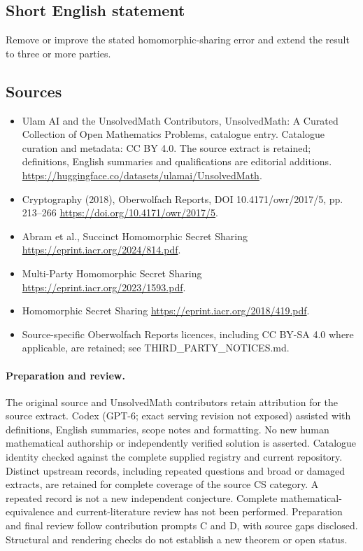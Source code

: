 \documentclass[11pt]{article}
\begin{document}
\subsection{Short English statement}
Remove or improve the stated homomorphic-sharing error and extend the result to three or more parties.
\subsection{Sources}
\begin{itemize}
\item[\hypertarget{source:statement:1}{S1}] Ulam AI and the UnsolvedMath Contributors, UnsolvedMath: A Curated Collection of Open Mathematics Problems, catalogue entry. Catalogue curation and metadata: CC BY 4.0. The source extract is retained; definitions, English summaries and qualifications are editorial additions.
\url{https://huggingface.co/datasets/ulamai/UnsolvedMath}.
\item[\hypertarget{source:statement:2}{S2}] Cryptography (2018), Oberwolfach Reports, DOI 10.4171/owr/2017/5, pp. 213--266
\url{https://doi.org/10.4171/owr/2017/5}.
\item[\hypertarget{source:statement:3}{S3}] Abram et al., Succinct Homomorphic Secret Sharing
\url{https://eprint.iacr.org/2024/814.pdf}.
\item[\hypertarget{source:statement:4}{S4}] Multi-Party Homomorphic Secret Sharing
\url{https://eprint.iacr.org/2023/1593.pdf}.
\item[\hypertarget{source:statement:5}{S5}] Homomorphic Secret Sharing
\url{https://eprint.iacr.org/2018/419.pdf}.
\item Source-specific Oberwolfach Reports licences, including CC BY-SA 4.0 where applicable, are retained; see THIRD\_PARTY\_NOTICES.md.
\end{itemize}
\paragraph{Preparation and review.}
The original source and UnsolvedMath contributors retain attribution for the source extract. Codex (GPT-6; exact serving revision not exposed) assisted with definitions, English summaries, scope notes and formatting. No new human mathematical authorship or independently verified solution is asserted. Catalogue identity checked against the complete supplied registry and current repository. Distinct upstream records, including repeated questions and broad or damaged extracts, are retained for complete coverage of the source CS category. A repeated record is not a new independent conjecture. Complete mathematical-equivalence and current-literature review has not been performed. Preparation and final review follow contribution prompts C and D, with source gaps disclosed. Structural and rendering checks do not establish a new theorem or open status.
\label{end:statement}
\end{document}

